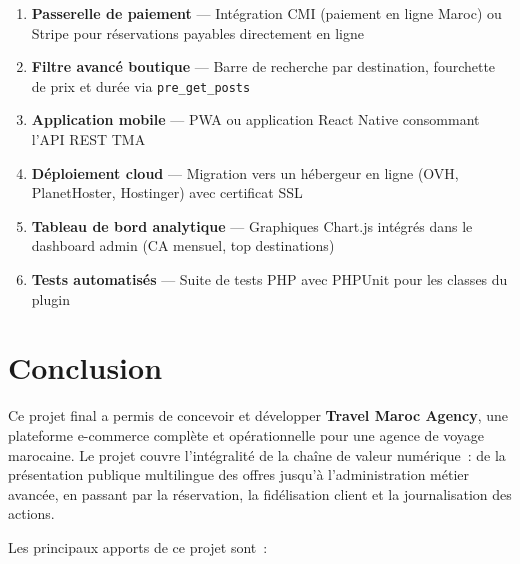 \documentclass[12pt,a4paper]{report}
\begin{document}
\begin{enumerate}
  \item \textbf{Passerelle de paiement} --- Int\'egration CMI (paiement en ligne
        Maroc) ou Stripe pour r\'eservations payables directement en ligne
  \item \textbf{Filtre avanc\'e boutique} --- Barre de recherche par destination,
        fourchette de prix et dur\'ee via \texttt{pre\_get\_posts}
  \item \textbf{Application mobile} --- PWA ou application React Native
        consommant l'API REST TMA
  \item \textbf{D\'eploiement cloud} --- Migration vers un h\'ebergeur en ligne
        (OVH, PlanetHoster, Hostinger) avec certificat SSL
  \item \textbf{Tableau de bord analytique} --- Graphiques Chart.js int\'egr\'es
        dans le dashboard admin (CA mensuel, top destinations)
  \item \textbf{Tests automatis\'es} --- Suite de tests PHP avec PHPUnit pour
        les classes du plugin
\end{enumerate}

\chapter{Conclusion}

Ce projet final a permis de concevoir et d\'evelopper \textbf{Travel Maroc Agency},
une plateforme e-commerce compl\`ete et op\'erationnelle pour une agence de voyage
marocaine. Le projet couvre l'int\'egralit\'e de la cha\^ine de valeur num\'erique~:
de la pr\'esentation publique multilingue des offres jusqu'\`a l'administration
m\'etier avanc\'ee, en passant par la r\'eservation, la fid\'elisation client et
la journalisation des actions.

\bigskip
Les principaux apports de ce projet sont~:
\end{document}
